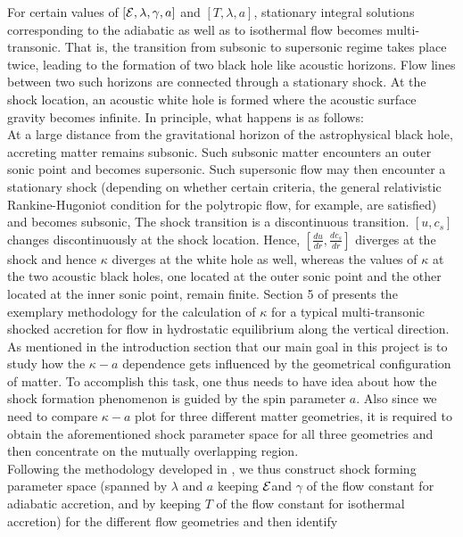 \documentclass[10pt,authoryear]{article}
\begin{document}
For certain values of $\left[{\cal E},\lambda,\gamma,a\right]$ and $\left[T,\lambda,a\right]$, stationary integral solutions 
corresponding to the adiabatic as well as to isothermal flow becomes multi-transonic. That is, the transition from subsonic to 
supersonic regime takes place twice, leading to the formation of two black hole like acoustic horizons. Flow lines between two 
such horizons are connected through a stationary shock. At the shock location, an acoustic white hole is formed where the 
acoustic surface gravity becomes infinite. In principle, what happens is as follows: \\
At a large distance from the gravitational horizon of the astrophysical black hole, accreting matter remains subsonic. 
Such subsonic matter encounters an outer sonic point and becomes supersonic. Such supersonic flow may then encounter a
stationary shock (depending on whether certain criteria, the general relativistic Rankine-Hugoniot condition for the polytropic flow, 
for example, are satisfied) and becomes subsonic, The shock transition is a discontinuous transition. $\left[u,c_s\right]$ 
changes discontinuously at the shock location. Hence, $\left[\frac{du}{dr},\frac{dc_s}{dr}\right]$ diverges at the shock and 
hence $\kappa$ diverges at the white hole as well, whereas the values of $\kappa$ at the two acoustic black holes, one located at the outer 
sonic point and the other located at the inner sonic point, remain finite. Section 5 of 
\cite{pmdc12cqg} 
presents the exemplary methodology for the calculation of $\kappa$ for a typical multi-transonic shocked accretion for flow in hydrostatic 
equilibrium along the vertical direction. \\
As mentioned in the introduction section that our main goal in this project is to study how the $\kappa - a$ dependence gets influenced 
by the geometrical configuration of matter. To accomplish this task, one thus needs to have idea about how the shock formation phenomenon 
is guided by the spin parameter $a$. Also since we need to compare $\kappa - a$ plot for three different matter geometries, it is required 
to obtain the aforementioned shock parameter space for all three geometries and then concentrate on the mutually overlapping region. \\
Following the methodology developed in 
\cite{tbnd17na}, 
we thus construct shock forming parameter space (spanned by $\lambda$ and $a$ keeping ${\cal E}$and $\gamma$ of the flow constant for 
adiabatic accretion, and by keeping $T$ of the flow constant for isothermal accretion) for the different flow geometries and then identify 
\end{document}
